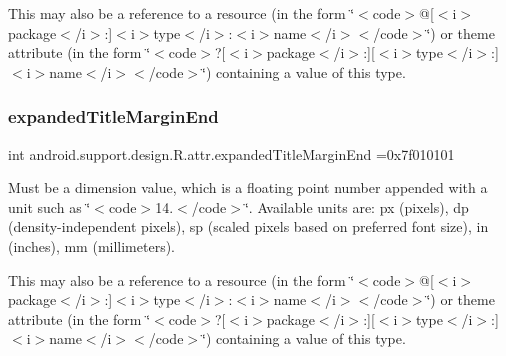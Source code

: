 This may also be a reference to a resource (in the form \char`\"{}$<$code$>$@\mbox{[}$<$i$>$package$<$/i$>$\+:\mbox{]}$<$i$>$type$<$/i$>$\+:$<$i$>$name$<$/i$>$$<$/code$>$\char`\"{}) or theme attribute (in the form \char`\"{}$<$code$>$?\mbox{[}$<$i$>$package$<$/i$>$\+:\mbox{]}\mbox{[}$<$i$>$type$<$/i$>$\+:\mbox{]}$<$i$>$name$<$/i$>$$<$/code$>$\char`\"{}) containing a value of this type. \mbox{\label{classandroid_1_1support_1_1design_1_1R_1_1attr_a27a3f75e044a26272b31b518082425c5}} 
\subsubsection{\texorpdfstring{expanded\+Title\+Margin\+End}{expandedTitleMarginEnd}}
{\footnotesize\ttfamily int android.\+support.\+design.\+R.\+attr.\+expanded\+Title\+Margin\+End =0x7f010101\hspace{0.3cm}{\ttfamily [static]}}

Must be a dimension value, which is a floating point number appended with a unit such as \char`\"{}$<$code$>$14.\+5sp$<$/code$>$\char`\"{}. Available units are\+: px (pixels), dp (density-\/independent pixels), sp (scaled pixels based on preferred font size), in (inches), mm (millimeters). 

This may also be a reference to a resource (in the form \char`\"{}$<$code$>$@\mbox{[}$<$i$>$package$<$/i$>$\+:\mbox{]}$<$i$>$type$<$/i$>$\+:$<$i$>$name$<$/i$>$$<$/code$>$\char`\"{}) or theme attribute (in the form \char`\"{}$<$code$>$?\mbox{[}$<$i$>$package$<$/i$>$\+:\mbox{]}\mbox{[}$<$i$>$type$<$/i$>$\+:\mbox{]}$<$i$>$name$<$/i$>$$<$/code$>$\char`\"{}) containing a value of this type. \mbox{\label{classandroid_1_1support_1_1design_1_1R_1_1attr_a2706209f152d7a23ca581cf160c8614b}} 
